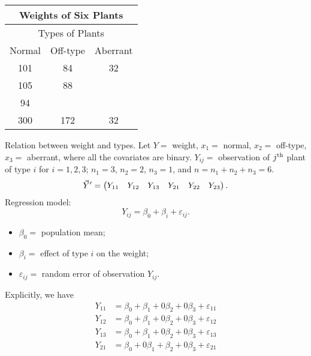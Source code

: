 \begin{Example}{}{}
    \begin{center}
        \begin{tabular}{ccc}
            \toprule
            \multicolumn{3}{c}{Weights of Six Plants} \\
            \midrule
            \multicolumn{3}{c}{Types of Plants}       \\
            \midrule
            Normal & Off-type & Aberrant              \\
            101    & 84       & 32                    \\
            105    & 88                               \\
            94                                        \\
            \midrule\midrule
            300    & 172      & 32                    \\
            \bottomrule
        \end{tabular}
    \end{center}
    Relation between weight and types.
    Let $ Y= $ weight, $ x_1= $ normal, $ x_2= $ off-type, $ x_3= $ aberrant,
    where all the covariates are binary.
    $ Y_{ij}= $ observation of $ j\textsuperscript{th} $ plant of type $ i $ for $ i=1,2,3 $;
    $ n_1=3 $, $ n_2=2 $, $ n_3=1 $, and $ n=n_1+n_2+n_3=6 $.
    \[ \vec{Y}'=\begin{pmatrix}
            Y_{11} & Y_{12} & Y_{13} & Y_{21} & Y_{22} & Y_{23}
        \end{pmatrix}. \]
    Regression model:
    \[ Y_{ij}=\beta_0+\beta_i+\varepsilon_{ij}. \]
    \begin{itemize}
        \item $ \beta_0= $ population mean;
        \item $ \beta_i= $ effect of type $ i $ on the weight;
        \item $ \varepsilon_{ij}= $ random error of observation $ Y_{ij} $.
    \end{itemize}
    Explicitly, we have
    \begin{align*}
        Y_{11} & =\beta_0+\beta_1+0\beta_2+0\beta_3+\varepsilon_{11}  \\
        Y_{12} & =\beta_0+\beta_1+0\beta_2+0\beta_3+\varepsilon_{12}  \\
        Y_{13} & =\beta_0+\beta_1+0\beta_2+0\beta_3+\varepsilon_{13}  \\
        Y_{21} & =\beta_0+0\beta_1+\beta_2+0\beta_3+\varepsilon_{21}  \\

\end{align*}
\end{Example}
